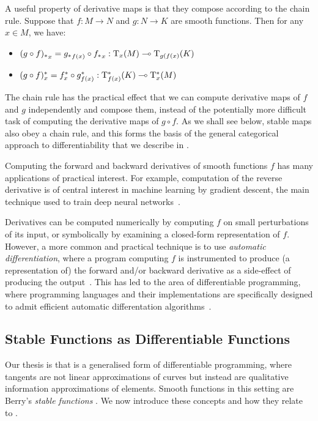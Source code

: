 \begin{remark}
  \label{rem:chain-rule}
  A useful property of derivative maps is that they compose according
  to the chain rule. Suppose that $f : M \to N$ and $g : N \to K$ are
  smooth functions. Then for any $x \in M$, we have:
  \begin{itemize}
  \item ${(g \circ f)_{*}}_x = {g_{*}}_{f(x)} \circ {f_{*}}_x : \mathrm{T}_x(M) \multimap \mathrm{T}_{g(f(x)}(K)$
  \item $(g \circ f)^{*}_x = f^{*}_x \circ g^{*}_{f(x)} : \mathrm{T}^*_{f(x)}(K) \multimap \mathrm{T}^*_x(M)$
  \end{itemize}
  The chain rule has the practical effect that we can compute
  derivative maps of $f$ and $g$ independently and compose them,
  instead of the potentially more difficult task of computing the
  derivative maps of $g \circ f$. As we shall see below, stable maps
  also obey a chain rule, and this forms the basis of the general
  categorical approach to differentiability that we describe in
  .
\end{remark}

Computing the forward and backward derivatives of smooth functions $f$ has many applications of practical interest. For example, computation of the reverse derivative is of central interest in machine learning by gradient descent, the main technique used to train deep neural networks~\cite{rumelhart88,goodfellow16}.

Derivatives can be computed numerically by computing $f$ on small perturbations of its input, or symbolically by examining a closed-form representation of $f$. However, a more common and practical technique is to use \emph{automatic differentiation}, where a program computing $f$ is instrumented to produce (a representation of) the forward and/or backward derivative as a side-effect of producing the output~\cite{linnainmaa76}. This has led to the area of differentiable programming, where programming languages and their implementations are specifically designed to admit efficient automatic differentation algorithms~\cite{jax2018github,abadi16,elliott17,sigal24}.

\subsection{Stable Functions as Differentiable Functions}

Our thesis is that \GPS is a generalised form of differentiable programming, where tangents are not linear approximations of curves but instead are qualitative information approximations of elements. Smooth functions in this setting are Berry's \emph{stable functions} \cite{berry79,berry82}. We now introduce these concepts and how they relate to \GPS.

